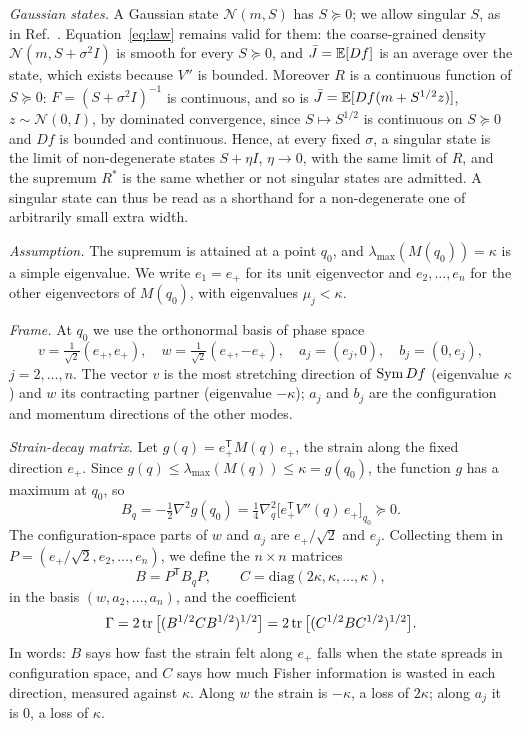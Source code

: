 \emph{Gaussian states.} A Gaussian state $\mathcal N(m,S)$ has $S \succeq 0$; we allow singular $S$, as in Ref.~\cite{namba2026gap}. Equation~\eqref{eq:law} remains valid for them: the coarse-grained density $\mathcal N(m, S + \sigma^2 I)$ is smooth for every $S \succeq 0$, and $\bar J = \mathbb{E}[Df]$ is an average over the state, which exists because $V''$ is bounded. Moreover $R$ is a continuous function of $S \succeq 0$: $F = (S+\sigma^2I)^{-1}$ is continuous, and so is $\bar J = \mathbb{E}[Df(m + S^{1/2}z)]$, $z \sim \mathcal N(0,I)$, by dominated convergence, since $S \mapsto S^{1/2}$ is continuous on $S \succeq 0$ and $Df$ is bounded and continuous. Hence, at every fixed $\sigma$, a singular state is the limit of non-degenerate states $S + \eta I$, $\eta \to 0$, with the same limit of $R$, and the supremum $R^*$ is the same whether or not singular states are admitted. A singular state can thus be read as a shorthand for a non-degenerate one of arbitrarily small extra width.

\emph{Assumption.} The supremum is attained at a point $q_0$, and $\lambda_{\max}(M(q_0)) = \kappa$ is a simple eigenvalue. We write $e_1 = e_+$ for its unit eigenvector and $e_2,\dots,e_n$ for the other eigenvectors of $M(q_0)$, with eigenvalues $\mu_j < \kappa$.

\emph{Frame.} At $q_0$ we use the orthonormal basis of phase space
\begin{equation}
v = \tfrac{1}{\sqrt2}(e_+, e_+),\quad w = \tfrac{1}{\sqrt2}(e_+, -e_+),\quad a_j = (e_j, 0),\quad b_j = (0, e_j),
\label{eq:frame}
\end{equation}
$j = 2,\dots,n$. The vector $v$ is the most stretching direction of $\operatorname{Sym} Df$ (eigenvalue $\kappa$) and $w$ its contracting partner (eigenvalue $-\kappa$); $a_j$ and $b_j$ are the configuration and momentum directions of the other modes.

\emph{Strain-decay matrix.} Let $g(q) = e_+^{\mathsf T} M(q)\, e_+$, the strain along the fixed direction $e_+$. Since $g(q) \leq \lambda_{\max}(M(q)) \leq \kappa = g(q_0)$, the function $g$ has a maximum at $q_0$, so
\begin{equation}
B_q = -\tfrac12\nabla^2 g(q_0) = \tfrac14\nabla^2_q\big[e_+^{\mathsf T}V''(q)\,e_+\big]_{q_0} \succeq 0 .
\label{eq:Bq}
\end{equation}
The configuration-space parts of $w$ and $a_j$ are $e_+/\sqrt2$ and $e_j$. Collecting them in $P = (e_+/\sqrt2, e_2, \dots, e_n)$, we define the $n\times n$ matrices
\begin{equation}
B = P^{\mathsf T} B_q P, \qquad C = \mathrm{diag}(2\kappa, \kappa, \dots, \kappa),
\label{eq:BC}
\end{equation}
in the basis $(w, a_2, \dots, a_n)$, and the coefficient
\begin{equation}
\Gamma = 2\operatorname{tr}\big[(B^{1/2} C B^{1/2})^{1/2}\big] = 2\operatorname{tr}\big[(C^{1/2} B C^{1/2})^{1/2}\big].
\label{eq:Gamma}
\end{equation}
In words: $B$ says how fast the strain felt along $e_+$ falls when the state spreads in configuration space, and $C$ says how much Fisher information is wasted in each direction, measured against $\kappa$. Along $w$ the strain is $-\kappa$, a loss of $2\kappa$; along $a_j$ it is $0$, a loss of $\kappa$.

